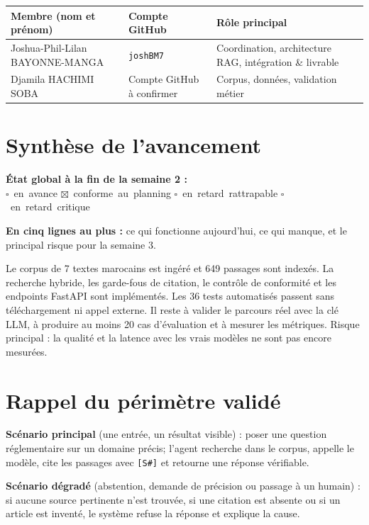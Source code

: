 \documentclass[11pt,a4paper]{article}
\newcommand{\case}{$\square$}
\newcommand{\coche}{$\boxtimes$}
\begin{document}
\medskip
\begin{tabularx}{\linewidth}{@{}LP{4.2cm}P{4.2cm}@{}}
\toprule
\textbf{Membre (nom et prénom)} & \textbf{Compte GitHub} & \textbf{Rôle principal} \\
\midrule
Joshua-Phil-Lilan BAYONNE-MANGA & \texttt{joshBM7} & Coordination, architecture RAG, intégration \& livrable \\
Djamila HACHIMI SOBA & Compte GitHub à confirmer & Corpus, données, validation métier \\
\bottomrule
\end{tabularx}

\section{Synthèse de l'avancement}

\textbf{État global à la fin de la semaine 2 :}\\
\mbox{\case~en avance} \quad \mbox{\coche~conforme au planning} \quad \mbox{\case~en retard rattrapable} \quad \mbox{\case~en retard critique}

\textbf{En cinq lignes au plus :} ce qui fonctionne aujourd'hui, ce qui manque, et le principal
risque pour la semaine 3.

Le corpus de 7 textes marocains est ingéré et 649 passages sont indexés. La recherche hybride,
les garde-fous de citation, le contrôle de conformité et les endpoints FastAPI sont implémentés.
Les 36 tests automatisés passent sans téléchargement ni appel externe. Il reste à valider le parcours
réel avec la clé LLM, à produire au moins 20 cas d'évaluation et à mesurer les métriques.
Risque principal : la qualité et la latence avec les vrais modèles ne sont pas encore mesurées.

\needspace{7cm}
\section{Rappel du périmètre validé}

\textbf{Scénario principal} (une entrée, un résultat visible) : poser une question réglementaire
sur un domaine précis; l'agent recherche dans le corpus, appelle le modèle, cite les passages
avec \texttt{[S\#]} et retourne une réponse vérifiable.

\textbf{Scénario dégradé} (abstention, demande de précision ou passage à un humain) : si aucune
source pertinente n'est trouvée, si une citation est absente ou si un article est inventé, le
système refuse la réponse et explique la cause.
\end{document}
